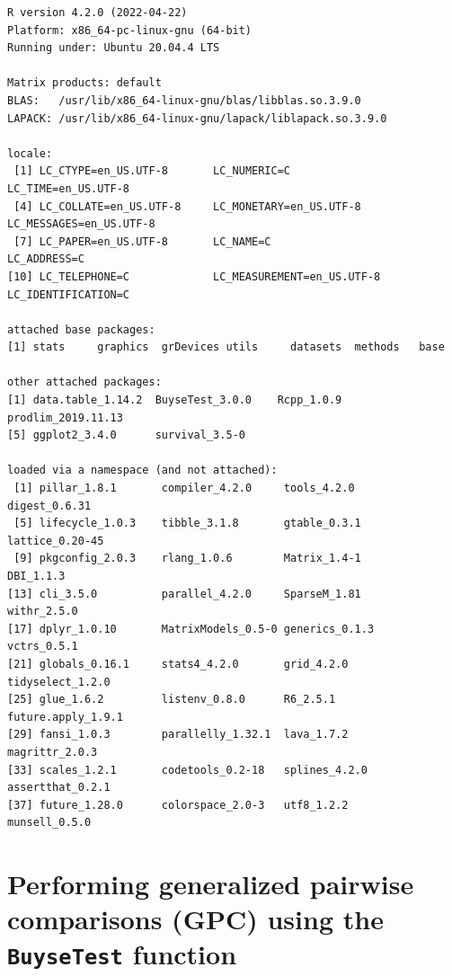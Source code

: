 \documentclass[12pt]{article}
\begin{document}
\begin{verbatim}
R version 4.2.0 (2022-04-22)
Platform: x86_64-pc-linux-gnu (64-bit)
Running under: Ubuntu 20.04.4 LTS

Matrix products: default
BLAS:   /usr/lib/x86_64-linux-gnu/blas/libblas.so.3.9.0
LAPACK: /usr/lib/x86_64-linux-gnu/lapack/liblapack.so.3.9.0

locale:
 [1] LC_CTYPE=en_US.UTF-8       LC_NUMERIC=C               LC_TIME=en_US.UTF-8       
 [4] LC_COLLATE=en_US.UTF-8     LC_MONETARY=en_US.UTF-8    LC_MESSAGES=en_US.UTF-8   
 [7] LC_PAPER=en_US.UTF-8       LC_NAME=C                  LC_ADDRESS=C              
[10] LC_TELEPHONE=C             LC_MEASUREMENT=en_US.UTF-8 LC_IDENTIFICATION=C       

attached base packages:
[1] stats     graphics  grDevices utils     datasets  methods   base     

other attached packages:
[1] data.table_1.14.2  BuyseTest_3.0.0    Rcpp_1.0.9         prodlim_2019.11.13
[5] ggplot2_3.4.0      survival_3.5-0    

loaded via a namespace (and not attached):
 [1] pillar_1.8.1       compiler_4.2.0     tools_4.2.0        digest_0.6.31     
 [5] lifecycle_1.0.3    tibble_3.1.8       gtable_0.3.1       lattice_0.20-45   
 [9] pkgconfig_2.0.3    rlang_1.0.6        Matrix_1.4-1       DBI_1.1.3         
[13] cli_3.5.0          parallel_4.2.0     SparseM_1.81       withr_2.5.0       
[17] dplyr_1.0.10       MatrixModels_0.5-0 generics_0.1.3     vctrs_0.5.1       
[21] globals_0.16.1     stats4_4.2.0       grid_4.2.0         tidyselect_1.2.0  
[25] glue_1.6.2         listenv_0.8.0      R6_2.5.1           future.apply_1.9.1
[29] fansi_1.0.3        parallelly_1.32.1  lava_1.7.2         magrittr_2.0.3    
[33] scales_1.2.1       codetools_0.2-18   splines_4.2.0      assertthat_0.2.1  
[37] future_1.28.0      colorspace_2.0-3   utf8_1.2.2         munsell_0.5.0
\end{verbatim}

\clearpage

\section{Performing generalized pairwise comparisons (GPC) using the \texttt{BuyseTest} function}
\label{sec:org71998b9}
\end{document}
